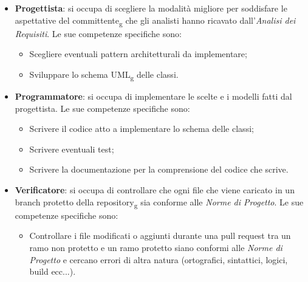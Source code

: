 \begin{itemize}
\item \textbf{Progettista}: si occupa di scegliere la modalità migliore per soddisfare le aspettative del committente\textsubscript{g} che gli analisti hanno ricavato dall'\textit{Analisi dei Requisiti}. Le sue competenze specifiche sono:
\begin{itemize}
	\item Scegliere eventuali pattern architetturali da implementare;
	\item Sviluppare lo schema UML\textsubscript{g} delle classi.
\end{itemize}

\item \textbf{Programmatore}: si occupa di implementare le scelte e i modelli fatti dal progettista. Le sue competenze specifiche sono:
\begin{itemize}
	\item Scrivere il codice atto a implementare lo schema delle classi;
	\item Scrivere eventuali test;
	\item Scrivere la documentazione per la comprensione del codice che scrive.
\end{itemize}

\item \textbf{Verificatore}: si occupa di controllare che ogni file che viene caricato in un branch protetto della repository\textsubscript{g} sia conforme alle \textit{Norme di Progetto}. Le sue competenze specifiche sono:
\begin{itemize}
	\item Controllare i file modificati o aggiunti durante una pull request tra un ramo non protetto e un ramo protetto siano conformi alle \textit{Norme di Progetto} e cercano errori di altra natura (ortografici, sintattici, logici, build ecc...).
\end{itemize}

\end{itemize}